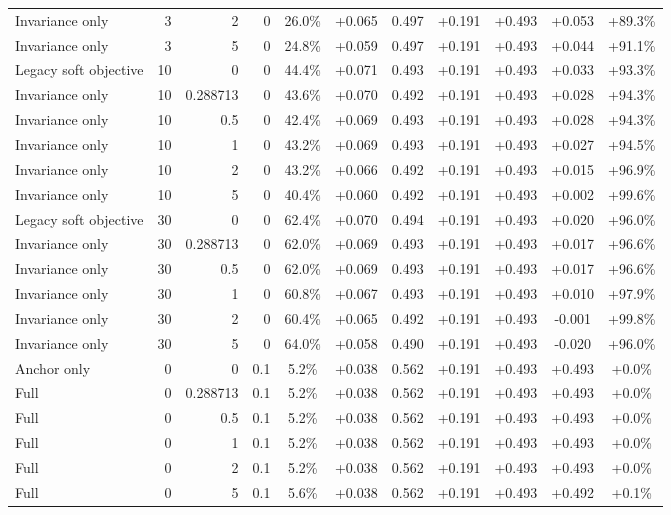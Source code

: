 \begin{table}[htbp]
\begin{tabular}{lrrrccccccc}
Invariance only & 3 & 2 & 0 & 26.0\% & +0.065 & 0.497 & +0.191 & +0.493 & +0.053 & +89.3\% \\
Invariance only & 3 & 5 & 0 & 24.8\% & +0.059 & 0.497 & +0.191 & +0.493 & +0.044 & +91.1\% \\
Legacy soft objective & 10 & 0 & 0 & 44.4\% & +0.071 & 0.493 & +0.191 & +0.493 & +0.033 & +93.3\% \\
Invariance only & 10 & 0.288713 & 0 & 43.6\% & +0.070 & 0.492 & +0.191 & +0.493 & +0.028 & +94.3\% \\
Invariance only & 10 & 0.5 & 0 & 42.4\% & +0.069 & 0.493 & +0.191 & +0.493 & +0.028 & +94.3\% \\
Invariance only & 10 & 1 & 0 & 43.2\% & +0.069 & 0.493 & +0.191 & +0.493 & +0.027 & +94.5\% \\
Invariance only & 10 & 2 & 0 & 43.2\% & +0.066 & 0.492 & +0.191 & +0.493 & +0.015 & +96.9\% \\
Invariance only & 10 & 5 & 0 & 40.4\% & +0.060 & 0.492 & +0.191 & +0.493 & +0.002 & +99.6\% \\
Legacy soft objective & 30 & 0 & 0 & 62.4\% & +0.070 & 0.494 & +0.191 & +0.493 & +0.020 & +96.0\% \\
Invariance only & 30 & 0.288713 & 0 & 62.0\% & +0.069 & 0.493 & +0.191 & +0.493 & +0.017 & +96.6\% \\
Invariance only & 30 & 0.5 & 0 & 62.0\% & +0.069 & 0.493 & +0.191 & +0.493 & +0.017 & +96.6\% \\
Invariance only & 30 & 1 & 0 & 60.8\% & +0.067 & 0.493 & +0.191 & +0.493 & +0.010 & +97.9\% \\
Invariance only & 30 & 2 & 0 & 60.4\% & +0.065 & 0.492 & +0.191 & +0.493 & -0.001 & +99.8\% \\
Invariance only & 30 & 5 & 0 & 64.0\% & +0.058 & 0.490 & +0.191 & +0.493 & -0.020 & +96.0\% \\
Anchor only & 0 & 0 & 0.1 & 5.2\% & +0.038 & 0.562 & +0.191 & +0.493 & +0.493 & +0.0\% \\
Full & 0 & 0.288713 & 0.1 & 5.2\% & +0.038 & 0.562 & +0.191 & +0.493 & +0.493 & +0.0\% \\
Full & 0 & 0.5 & 0.1 & 5.2\% & +0.038 & 0.562 & +0.191 & +0.493 & +0.493 & +0.0\% \\
Full & 0 & 1 & 0.1 & 5.2\% & +0.038 & 0.562 & +0.191 & +0.493 & +0.493 & +0.0\% \\
Full & 0 & 2 & 0.1 & 5.2\% & +0.038 & 0.562 & +0.191 & +0.493 & +0.493 & +0.0\% \\
Full & 0 & 5 & 0.1 & 5.6\% & +0.038 & 0.562 & +0.191 & +0.493 & +0.492 & +0.1\% \\

\end{tabular}
\end{table}
